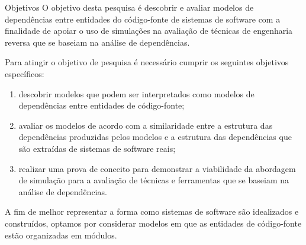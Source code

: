 \begin{section}{Objetivos}
	O objetivo desta pesquisa é descobrir e avaliar modelos de dependências entre entidades do código-fonte de sistemas de software com a finalidade de apoiar o uso de simulações na avaliação de técnicas de engenharia reversa que se baseiam na análise de dependências.
	
	Para atingir o objetivo de pesquisa é necessário cumprir os seguintes objetivos específicos:
	
	\begin{enumerate}
		\item descobrir modelos que podem ser interpretados como modelos de dependências entre entidades de código-fonte;
		\item avaliar os modelos de acordo com a similaridade entre a estrutura das dependências produzidas pelos modelos e a estrutura das dependências que são extraídas de sistemas de software reais;
		\item realizar uma prova de conceito para demonstrar a viabilidade da abordagem de simulação para a avaliação de técnicas e ferramentas que se baseiam na análise de dependências.
	\end{enumerate}
	
	A fim de melhor representar a forma como sistemas de software são idealizados e construídos, optamos por considerar modelos em que as entidades de código-fonte estão organizadas em módulos. %
	
\end{section}

